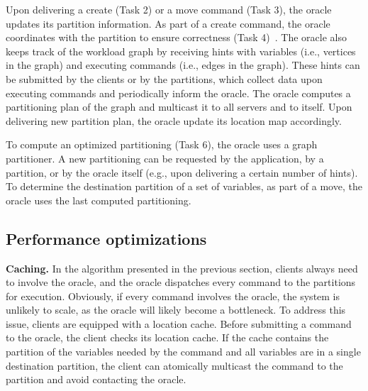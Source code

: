 Upon delivering a create (Task 2) or a move command (Task 3), the oracle updates its partition information.
As part of a create command, the oracle coordinates with the partition to ensure correctness (Task 4)~\cite{bezerra2014ssmr}.
%
The oracle also keeps track of the workload graph by receiving hints with variables (i.e., vertices in the graph) and executing commands (i.e., edges in the graph). These hints can be submitted by the clients or by the partitions, which collect data upon executing commands and periodically inform the oracle.
The oracle computes a partitioning plan of the graph and multicast it to all servers and to itself. Upon delivering new partition plan, the oracle update its location map accordingly.

To compute an optimized partitioning (Task 6), the oracle uses a graph partitioner.
A new partitioning can be requested by the application, by a partition, or by the oracle itself (e.g., upon delivering a certain number of hints).
To determine the destination partition of a set of variables, as part of a move, the oracle uses 
the last computed partitioning.


\subsection{Performance optimizations}
\label{sec:optm}

\textbf{Caching.} In the algorithm presented in the previous section, clients always need to involve the oracle, and the oracle dispatches every command to the partitions for execution.
Obviously, if every command involves the oracle, the system is unlikely to scale, as the oracle will likely become a bottleneck.
To address this issue, clients are equipped with a location cache.
Before submitting a command to the oracle, the client checks its location cache.
If the cache contains the partition of the variables needed by the command and all variables are in a single destination partition, the client can atomically multicast the command to the partition and avoid contacting the oracle. 

